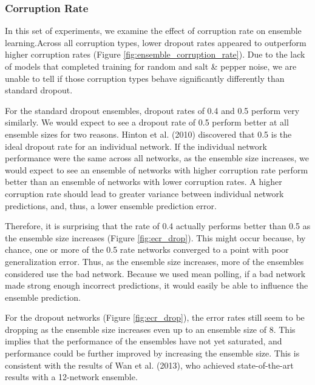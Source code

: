 \documentclass{article} %
\begin{document}
\subsubsection{Corruption Rate}

In this set of experiments, we examine the effect of corruption rate on ensemble learning.Across all corruption types, lower dropout rates appeared to outperform higher corruption rates (Figure \ref{fig:ensemble_corruption_rate}). Due to the lack of models that completed training for random and salt \& pepper noise, we are unable to tell if those corruption types behave significantly differently than standard dropout.

For the standard dropout ensembles, dropout rates of 0.4 and 0.5 perform very similarly. We would expect to see a dropout rate of 0.5 perform better at all ensemble sizes for two reasons. Hinton et al. (2010) discovered that 0.5 is the ideal dropout rate for an individual network. If the individual network performance were the same across all networks, as the ensemble size increases, we would expect to see an ensemble of networks with higher corruption rate perform better than an ensemble of networks with lower corruption rates. A higher corruption rate should lead to greater variance between individual network predictions, and, thus, a lower ensemble prediction error.

Therefore, it is surprising that the rate of 0.4 actually performs better than 0.5 as the ensemble size increases (Figure \ref{fig:ecr_drop}). This might occur because, by chance, one or more of the 0.5 rate networks converged to a point with poor generalization error. Thus, as the ensemble size increases, more of the ensembles considered use the bad network. Because we used mean polling, if a bad network made strong enough incorrect predictions, it would easily be able to influence the ensemble prediction.

For the dropout networks (Figure \ref{fig:ecr_drop}), the error rates still seem to be dropping as the ensemble size increases even up to an ensemble size of 8. This implies that the performance of the ensembles have not yet saturated, and performance could be further improved by increasing the ensemble size. This is consistent with the results of Wan et al. (2013), who achieved state-of-the-art results with a 12-network ensemble.
\end{document}
